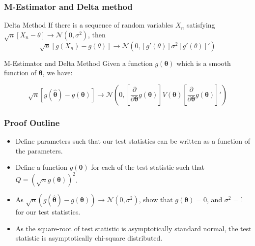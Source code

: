 \documentclass{beamer}
\begin{document}
\begin{frame}
	\frametitle{M-Estimator and Delta method}
	\begin{block}{Delta Method}
		If there is a sequence of random variables $X_n$ satisfying $ \sqrt{n}[X_n - \theta] \rightarrow \mathcal{N}(0, \sigma^2) $, then
		$$ \sqrt{n}[g(X_n) - g(\theta)] \rightarrow \mathcal{N}(0, [g'(\theta)] \sigma^2 [g'(\theta)]')$$
	\end{block}
	\begin{block}{M-Estimator and Delta Method}
		Given a function $ g(\bm{\theta}) $ which is a smooth function of $ \bm{\theta} $, we have:

		$$ \sqrt{n} \left[ g(\hat{\bm{\theta}}) - g(\bm{\theta}) \right] \to \mathcal{N} \left( 0, \left[ \frac{\partial}{\partial \bm{\theta}} g(\bm{\theta}) \right] V(\bm{\theta}) \left[ \frac{\partial}{\partial \bm{\theta}} g(\bm{\theta}) \right]' \right) $$
	\end{block}
\end{frame}

\begin{frame}
	\frametitle{Proof Outline}
	\begin{itemize}
		\item Define parameters such that our test statistics can be written as a function of the parameters.
		\item Define a function $ g(\bm{\theta}) $ for each of the test statistic such that $ Q = (\sqrt{n}g(\bm{\theta}))^2 $.
		\item As $ \sqrt{n}(g(\hat{\bm{\theta}}) - g(\bm{\theta})) \to \mathcal{N}(0, \sigma^2) $, show that $ g(\bm{\theta}) = 0 $, and $ \sigma^2 = \mathbb{I} $ for our test statistics.
		\item As the square-root of test statistic is asymptotically standard normal, the test statistic is asymptotically chi-square distributed.
	\end{itemize}

\end{frame}
\end{document}
